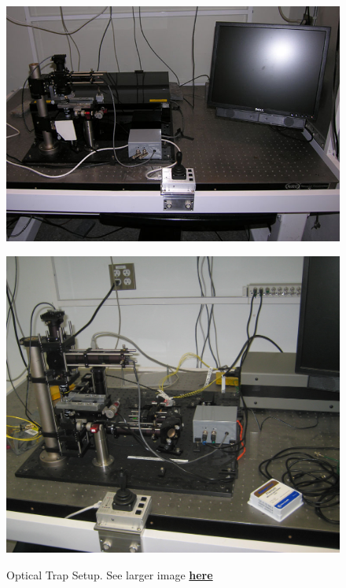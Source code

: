 \documentclass{../lab}
\begin{document}
\begin{figure}[h]
\begin{minipage}{0.32\textwidth}
    \href{http://experimentationlab.berkeley.edu/sites/default/files/images/OTZ_0141B.jpg}{\includegraphics[width=\linewidth,keepaspectratio]{images/OTZ_0141B.jpg}}
    \caption{Optical Trap Setup. See larger image \href{http://experimentationlab.berkeley.edu/sites/default/files/images/OTZ_0141B.jpg}{\textbf{here}}}
\end{minipage}
\begin{minipage}{0.32\textwidth}
    \href{http://experimentationlab.berkeley.edu/sites/default/files/images/OTZ_3551_Crop.jpg}{\includegraphics[width=\linewidth,keepaspectratio]{images/OTZ_3551_Crop.jpg}}

\end{minipage}
\end{figure}
\end{document}

